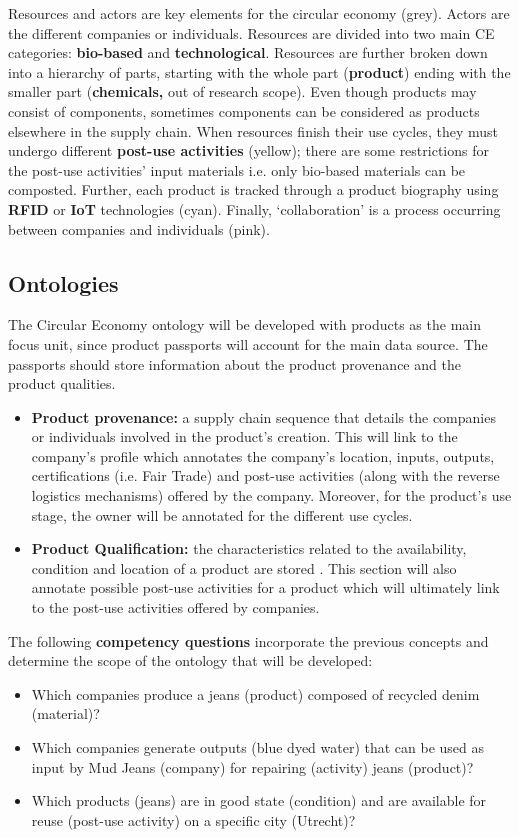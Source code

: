 \documentclass[runningheads,a4paper]{llncs}
\begin{document}
Resources and actors are key elements for the circular economy (grey).  Actors are the different companies or individuals. Resources are divided into two main CE categories: {\bf bio-based} and {\bf technological}. Resources are further broken down into a hierarchy of parts, starting with the whole part ({\bf product}) ending with the smaller part ({\bf chemicals,} out of research scope). Even though products may consist of components, sometimes components can be considered as products elsewhere in the supply chain. When resources finish their use cycles, they must undergo different {\bf post-use activities} (yellow); there are some restrictions for the post-use activities' input materials i.e. only bio-based materials can be composted. Further, each product is tracked through a product biography using {\bf RFID} or {\bf IoT} technologies (cyan). Finally, `collaboration' is a process occurring between companies and individuals (pink). 

\subsection{Ontologies}

The Circular Economy ontology will be developed with products as the main focus unit, since product passports will account for the main data source. The passports should store information about the product provenance and the product qualities.
\begin{itemize}
\item {\bf Product provenance:} a supply chain sequence that details the companies or individuals involved in the product's creation. This will link to the company's profile which annotates the company's location, inputs, outputs, certifications (i.e. Fair Trade) and post-use activities (along with the reverse logistics mechanisms) offered by the company. Moreover, for the product's use stage, the owner will be annotated for the different use cycles.
\item {\bf Product Qualification: }the characteristics related to the availability, condition and location of a product are stored  \cite{_Ref490914619}. This section will also annotate possible post-use activities for a product which will ultimately link to the post-use activities offered by companies.
\end{itemize}

The following {\bf competency questions }incorporate the previous concepts and determine the scope of the ontology that will be developed:
\begin{itemize}
\item Which companies produce a jeans (product) composed of recycled denim (material)?
\item Which companies generate outputs (blue dyed water) that can be used as input by Mud Jeans (company) for repairing (activity) jeans (product)?
\item Which products (jeans) are in good state (condition) and are available for reuse (post-use activity) on a specific city (Utrecht)?
\end{itemize}
\end{document}
